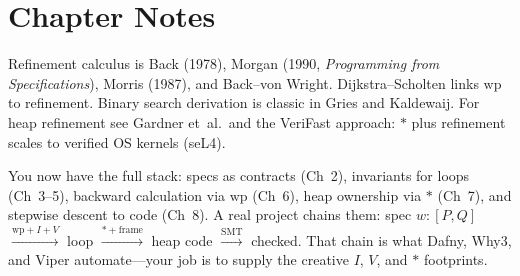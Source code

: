 \section*{Chapter Notes}
Refinement calculus is Back (1978), Morgan (1990, \emph{Programming from Specifications}), Morris (1987), and Back--von Wright. Dijkstra--Scholten links $\text{wp}$ to refinement. Binary search derivation is classic in Gries and Kaldewaij. For heap refinement see Gardner et~al.\ and the VeriFast approach: $*$ plus refinement scales to verified OS kernels (seL4).

\smallskip
\begin{remark}
You now have the full stack: specs as contracts (Ch~2), invariants for loops (Ch~3--5), backward calculation via $\text{wp}$ (Ch~6), heap ownership via $*$ (Ch~7), and stepwise descent to code (Ch~8). A real project chains them: spec $w:[P,Q]$ $\xrightarrow{\text{wp}+I+V}$ loop $\xrightarrow{*+\text{frame}}$ heap code $\xrightarrow{\text{SMT}}$ checked. That chain is what Dafny, Why3, and Viper automate—your job is to supply the creative $I$, $V$, and $*$ footprints.
\end{remark}

\smallskip
